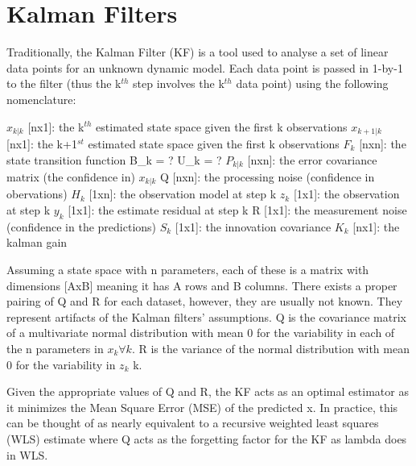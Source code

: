\section{Kalman Filters}
Traditionally, the Kalman Filter (KF) is a tool used to analyse a set of linear data points for an unknown dynamic model. Each data point is passed in 1-by-1 to the filter (thus the k$^{th}$ step involves the k$^{th}$ data point) using the following nomenclature:\newline

$x_{k|k}$ [nx1]:    the k$^{th}$ estimated state space given the first k observations \newline
$x_{k+1|k}$ [nx1]:  the k+1$^{st}$ estimated state space given the first k observations\newline
$F_{k}$ [nxn]:  the state transition function\newline
B_k = ?
U_k = ?\newline
$P_{k|k}$ [nxn]:  the error covariance matrix (the confidence in) $x_{k|k}$\newline
Q [nxn]:    the processing noise (confidence in obervations)\newline
$H_{k}$ [1xn]: the observation model at step k\newline
$z_{k}$ [1x1]: the observation at step k\newline
$y_{k}$ [1x1]: the estimate residual at step k\newline
R [1x1]: the measurement noise (confidence in the predictions)\newline
$S_{k}$ [1x1]: the innovation covariance\newline
$K_{k}$ [nx1]: the kalman gain\newline

Assuming a state space with n parameters, each of these is a matrix with dimensions [AxB] meaning it has A rows and B columns. There exists a proper pairing of Q and R for each dataset, however, they are usually not known. They represent artifacts of the Kalman filters' assumptions. Q is the covariance matrix of a multivariate normal distribution with mean 0 for the variability in each of the n parameters in $x_{k} \forall k$. R is the variance of the normal distribution with mean 0 for the variability in $z_{k}$  \forall k.

Given the appropriate values of Q and R, the KF acts as an optimal estimator as it minimizes the Mean Square Error (MSE) of the predicted x. In practice, this can be thought of as nearly equivalent to a recursive weighted least squares (WLS) estimate where Q acts as the forgetting factor for the KF as lambda does in WLS. 

